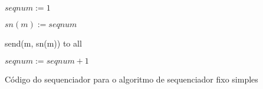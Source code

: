 \begin{algorithm}
\DontPrintSemicolon

$seqnum := 1$

 {
    $sn(m) := seqnum$

    send(m, sn(m)) to all

    $seqnum := seqnum + 1$
}

\caption{Código do sequenciador para o algoritmo de sequenciador fixo simples
\cite{journals/csur/DefagoSU04}}
\label{algo:simple-fixed-sequencer}
\end{algorithm}
